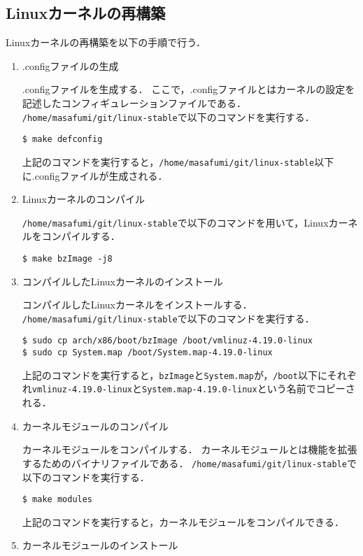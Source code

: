 \documentclass[12pt]{jsarticle}
\begin{document}
\subsection{Linuxカーネルの再構築}
Linuxカーネルの再構築を以下の手順で行う．
\begin{enumerate}
\item .configファイルの生成

  .configファイルを生成する．
  ここで，.configファイルとはカーネルの設定を記述したコンフィギュレーションファイルである．
  \verb|/home/masafumi/git/linux-stable|で以下のコマンドを実行する．
\begin{verbatim}
$ make defconfig
\end{verbatim}
上記のコマンドを実行すると，\verb|/home/masafumi/git/linux-stable|以下に.configファイルが生成される．

\item\label{enum:compile} Linuxカーネルのコンパイル

  \verb|/home/masafumi/git/linux-stable|で以下のコマンドを用いて，Linuxカーネルをコンパイルする．
\begin{verbatim}
$ make bzImage -j8
\end{verbatim}

\item コンパイルしたLinuxカーネルのインストール
  
  コンパイルしたLinuxカーネルをインストールする．
  \verb|/home/masafumi/git/linux-stable|で以下のコマンドを実行する．
\begin{verbatim}
$ sudo cp arch/x86/boot/bzImage /boot/vmlinuz-4.19.0-linux
$ sudo cp System.map /boot/System.map-4.19.0-linux
\end{verbatim}
上記のコマンドを実行すると，\verb|bzImage|と\verb|System.map|が，\verb|/boot|以下にそれぞれ\verb|vmlinuz-4.19.0-linux|と\verb|System.map-4.19.0-linux|という名前でコピーされる．

\item\label{enum:module:module_compile} カーネルモジュールのコンパイル

  カーネルモジュールをコンパイルする．
  カーネルモジュールとは機能を拡張するためのバイナリファイルである．
  \verb|/home/masafumi/git/linux-stable|で以下のコマンドを実行する．
\begin{verbatim}
$ make modules
\end{verbatim}
上記のコマンドを実行すると，カーネルモジュールをコンパイルできる．

\item\label{enum:module_install} カーネルモジュールのインストール


\end{enumerate}
\end{document}
